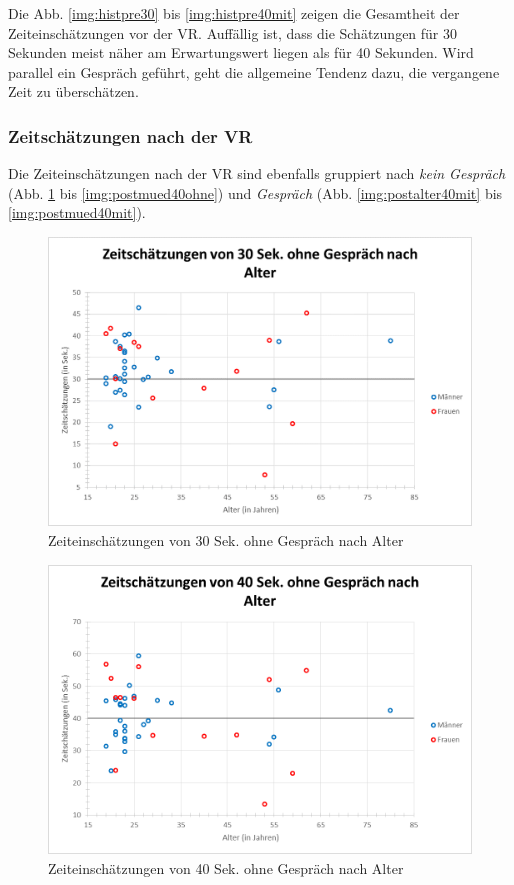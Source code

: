 \documentclass{Paper}
\begin{document}
Die Abb. \ref{img:histpre30} bis \ref{img:histpre40mit} zeigen die Gesamtheit der Zeiteinschätzungen vor der VR. Auffällig ist, dass die Schätzungen für 30 Sekunden meist näher am Erwartungswert liegen als für 40 Sekunden. Wird parallel ein Gespräch geführt, geht die allgemeine Tendenz dazu, die vergangene Zeit zu überschätzen.
\clearpage

\subsubsection{Zeitschätzungen nach der VR}

Die Zeiteinschätzungen nach der VR sind ebenfalls gruppiert nach \textit{kein Gespräch} (Abb. \ref{img:postalter30ohne} bis \ref{img:postmued40ohne}) und \textit{Gespräch} (Abb. \ref{img:postalter40mit} bis \ref{img:postmued40mit}).
\begin{figure}[H]
	\centering
	\includegraphics[scale=0.7]{../Diagramme/scatterPost/30ohne_alter.png}
	\caption{Zeiteinschätzungen von 30 Sek. ohne Gespräch nach Alter}
	\label{img:postalter30ohne}
\end{figure}
\begin{figure}[H]
	\centering
	\includegraphics[scale=0.7]{../Diagramme/scatterPost/40ohne_alter.png}
	\caption{Zeiteinschätzungen von 40 Sek. ohne Gespräch nach Alter}
	\label{img:postalter40ohne}
\end{figure}
\end{document}
